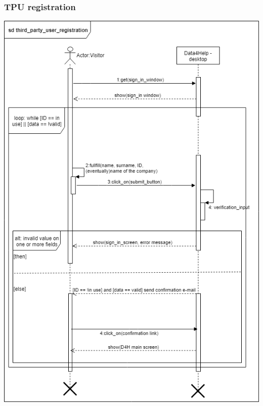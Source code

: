 \subsubsection{TPU registration}
\includegraphics[scale = 0.5]{sections/requirements/sequenceDiagrams/third_party_user_registration.png}
\clearpage
